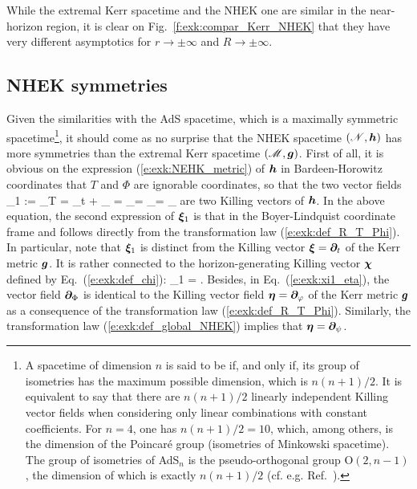\begin{remark}
While the extremal Kerr spacetime and the NHEK one are similar in the
near-horizon region, it is clear on Fig.~\ref{f:exk:compar_Kerr_NHEK} that they
have very different asymptotics for $r\to \pm \infty$ and $R\to \pm \infty$.
\end{remark}

\subsection{NHEK symmetries}

Given the similarities with the AdS spacetime, which is a maximally symmetric spacetime\footnote{A spacetime of dimension $n$
is said to be  if, and only if,
its group of isometries has the maximum possible dimension, which is $n(n+1)/2$.
It is equivalent to say that there are $n(n+1)/2$ linearly independent Killing vector fields
when considering only linear combinations with constant coefficients.
For $n=4$, one has $n(n+1)/2=10$, which, among others,
is the dimension of the Poincaré group (isometries of Minkowski spacetime).
The group of isometries of AdS$_n$ is the pseudo-orthogonal group $\mathrm{O}(2, n-1)$,
the dimension of which is exactly $n(n+1)/2$ (cf. e.g. Ref.~\cite{ONeil83}).},
it should come as no surprise that the NHEK spacetime $(\mathscr{N},\bm{h})$
has more symmetries than the extremal Kerr spacetime $(\mathscr{M},\bm{g})$. First of all, it is
obvious on the expression (\ref{e:exk:NEHK_metric}) of $\bm{h}$
in Bardeen-Horowitz coordinates that $T$ and $\Phi$ are ignorable coordinates,
so that the two vector fields
\be \label{e:exk:xi1_eta}
   \w{\xi}_1 := \wpar_T =    \wpar_t +  \wpar_\ph
   \qand
   \w{\eta} = \wpar_\Phi = \wpar_\ph = \wpar_\psi
\ee
are two Killing vectors of $\bm{h}$. In the above equation, the second expression of $\bm{\xi}_1$
is that in the Boyer-Lindquist coordinate frame and
follows directly from the transformation law (\ref{e:exk:def_R_T_Phi}).
In particular, note that $\bm{\xi}_1$ is distinct from the Killing vector
$\bm{\xi} = \bm{\partial}_t$ of the Kerr metric $\bm{g}$. It is rather connected
to the horizon-generating Killing vector $\bm{\chi}$ defined by
Eq.~(\ref{e:exk:def_chi}):
\be
    \w{\xi}_1 =  \w{\chi} .
\ee
Besides, in Eq.~(\ref{e:exk:xi1_eta}),
the vector field $\bm{\partial}_\Phi$ is identical
to the Killing vector field $\bm{\eta} = \bm{\partial}_\varphi$ of the Kerr metric $\bm{g}$
as a consequence of the transformation law (\ref{e:exk:def_R_T_Phi}). Similarly,
the transformation law (\ref{e:exk:def_global_NHEK}) implies that
$\bm{\eta} = \bm{\partial}_\psi$.


